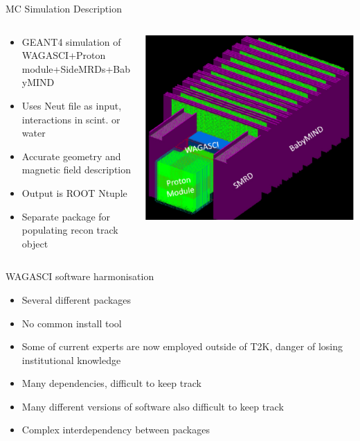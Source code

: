 \documentclass{beamer}
\begin{document}
\begin{frame}{MC Simulation Description} 	

\begin{columns}
\begin{column}{.5\textwidth}
\begin{itemize}
	\item GEANT4 simulation of WAGASCI+Proton module+SideMRDs+BabyMIND
	\item Uses Neut file as input, interactions in scint. or water
	\item Accurate geometry and magnetic field description
	\item Output is ROOT Ntuple
	\item Separate package for populating recon track object  
\end{itemize}
\end{column}
\begin{column}{.5\textwidth}
\includegraphics[width=\textwidth]{images/geo.pdf}
\end{column}	
\end{columns}

\end{frame}

\begin{frame}{WAGASCI software harmonisation}
    \begin{itemize}
        \item Several different packages
        \item No common install tool
        \item Some of current experts are now employed outside of T2K,  danger of losing institutional knowledge
        \item Many dependencies, difficult to keep track
        \item Many different versions of software also difficult to keep track
        \item Complex interdependency between packages
    \end{itemize}
\end{frame}
\end{document}
